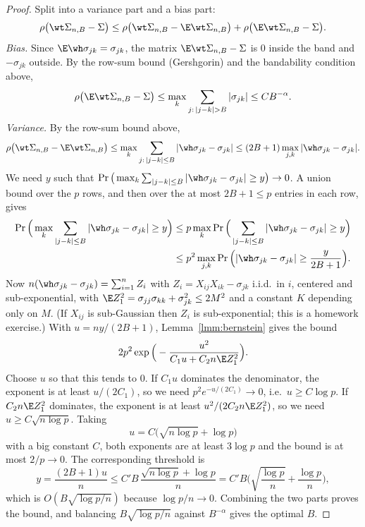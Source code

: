 \begin{proof}
Split into a variance part and a bias part:
\[\rho\big(\wt\Sigma_{n,B} - \Sigma\big) \le \rho\big(\wt\Sigma_{n,B} - \E\wt\Sigma_{n,B}\big) + \rho\big(\E\wt\Sigma_{n,B} - \Sigma\big).\]
\emph{Bias.} Since \(\E\wh\sigma_{jk} = \sigma_{jk}\), the matrix \(\E\wt\Sigma_{n,B} - \Sigma\) is \(0\) inside the band and \(-\sigma_{jk}\) outside. By the row-sum bound (Gershgorin) and the bandability condition above,
\[\rho\big(\E\wt\Sigma_{n,B} - \Sigma\big) \le \max_k \sum_{j:\, |j-k| > B} |\sigma_{jk}| \le C B^{-\alpha}.\]
\emph{Variance.} By the row-sum bound above,
\[\rho\big(\wt\Sigma_{n,B} - \E\wt\Sigma_{n,B}\big) \le \max_k \sum_{j:\, |j-k| \le B} |\wh\sigma_{jk} - \sigma_{jk}| \le (2B+1) \max_{j,k} |\wh\sigma_{jk} - \sigma_{jk}|.\]
We need \(y\) such that \(\Pr\big(\max_k \sum_{|j-k| \le B} |\wh\sigma_{jk} - \sigma_{jk}| \ge y\big) \to 0\). A union bound over the \(p\) rows, and then over the at most \(2B+1 \le p\) entries in each row, gives
\begin{align*}
\Pr\Big(\max_k \sum_{|j-k| \le B} |\wh\sigma_{jk} - \sigma_{jk}| \ge y\Big)
&\le p \max_k \Pr\Big(\sum_{|j-k| \le B} |\wh\sigma_{jk} - \sigma_{jk}| \ge y\Big)\\
&\le p^2 \max_{j,k} \Pr\Big(|\wh\sigma_{jk} - \sigma_{jk}| \ge \frac{y}{2B+1}\Big).
\end{align*}
Now \(n(\wh\sigma_{jk} - \sigma_{jk}) = \sum_{i=1}^n Z_i\) with \(Z_i = X_{ij} X_{ik} - \sigma_{jk}\) i.i.d.\ in \(i\), centered and sub-exponential, with \(\E Z_1^2 = \sigma_{jj}\sigma_{kk} + \sigma_{jk}^2 \le 2M^2\) and a constant \(K\) depending only on \(M\). (If \(X_{ij}\) is sub-Gaussian then \(Z_i\) is sub-exponential; this is a homework exercise.) With \(u = ny/(2B+1)\), Lemma~\ref{lmm:bernstein} gives the bound
\[2p^2 \exp\Big(-\frac{u^2}{C_1 u + C_2 n \E Z_1^2}\Big).\]
Choose \(u\) so that this tends to \(0\). If \(C_1 u\) dominates the denominator, the exponent is at least \(u/(2C_1)\), so we need \(p^2 e^{-u/(2C_1)} \to 0\), i.e.\ \(u \ge C \log p\). If \(C_2 n \E Z_1^2\) dominates, the exponent is at least \(u^2/(2C_2 n \E Z_1^2)\), so we need \(u \ge C\sqrt{n \log p}\). Taking
\[u = C\big(\sqrt{n \log p} + \log p\big)\]
with a big constant \(C\), both exponents are at least \(3 \log p\) and the bound is at most \(2/p \to 0\). The corresponding threshold is
\[y = \frac{(2B+1) u}{n} \le C' B\, \frac{\sqrt{n \log p} + \log p}{n} = C' B \Big(\sqrt{\frac{\log p}{n}} + \frac{\log p}{n}\Big),\]
which is \(O(B\sqrt{\log p / n})\) because \(\log p / n \to 0\). Combining the two parts proves the bound, and balancing \(B \sqrt{\log p / n}\) against \(B^{-\alpha}\) gives the optimal \(B\).
\end{proof}

